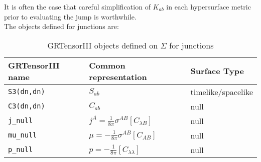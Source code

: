 \documentclass{article}
\begin{document}
It is often the case that careful simplification of $K_{ab}$ in each hypersurface metric prior to evaluating the jump is worthwhile. \\

The objects defined for junctions are:
\renewcommand{\arraystretch}{1.5}
\begin{table}[h]
  \begin{center}
    \begin{tabular}{lll}\hline\hline
      \textbf{GRTensorIII name} & \textbf{Common representation} & Surface Type \\ \hline
      \texttt{S3(dn,dn)}        & $S_{ab} $ & timelike/spacelike  \\
      \texttt{C3(dn,dn)}        & $C_{ab} $ & null \\
      \texttt{j\_null}   & $ j^A = \frac{1}{8 \pi} \sigma^{AB} \left[C_{\lambda B}\right]$ & null \\
      \texttt{mu\_null}   &$ \mu= - \frac{1}{8 \pi} \sigma^{AB} \left[C_{AB}\right]$ & null \\
      \texttt{p\_null}   &$ p = -\frac{1}{8 \pi} \left[C_{\lambda \lambda}\right]$ & null \\
    \end{tabular}
    \caption{GRTensorIII objects defined on $\Sigma$ for junctions}
    \label{tab:junc}
  \end{center}
\end{table}


\vfill


\end{document}
